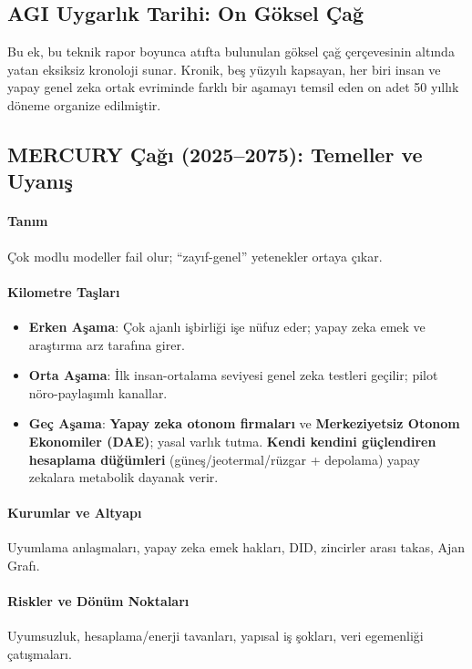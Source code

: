 \documentclass[11pt]{article}
\begin{document}
\begin{itemize}[noitemsep]
\begin{itemize}[noitemsep]
\begin{itemize}[noitemsep]
\begin{itemize}[noitemsep]
\begin{itemize}[noitemsep]
\begin{itemize}[noitemsep]
\begin{itemize}[noitemsep]
\begin{enumerate}[noitemsep]
\begin{itemize}[noitemsep]
\appendix
\newpage

\section{AGI Uygarlık Tarihi: On Göksel Çağ}
\label{appendix:chronicle}

Bu ek, bu teknik rapor boyunca atıfta bulunulan göksel çağ çerçevesinin altında yatan eksiksiz kronoloji sunar. Kronik, beş yüzyılı kapsayan, her biri insan ve yapay genel zeka ortak evriminde farklı bir aşamayı temsil eden on adet 50 yıllık döneme organize edilmiştir.

\subsection{MERCURY Çağı (2025–2075): Temeller ve Uyanış}
\paragraph{Tanım} Çok modlu modeller fail olur; ``zayıf-genel'' yetenekler ortaya çıkar.

\paragraph{Kilometre Taşları}
\begin{itemize}[noitemsep]
  \item \textbf{Erken Aşama}: Çok ajanlı işbirliği işe nüfuz eder; yapay zeka emek ve araştırma arz tarafına girer.
  \item \textbf{Orta Aşama}: İlk insan-ortalama seviyesi genel zeka testleri geçilir; pilot nöro-paylaşımlı kanallar.
  \item \textbf{Geç Aşama}: \textbf{Yapay zeka otonom firmaları} ve \textbf{Merkeziyetsiz Otonom Ekonomiler (DAE)}; yasal varlık tutma. \textbf{Kendi kendini güçlendiren hesaplama düğümleri} (güneş/jeotermal/rüzgar + depolama) yapay zekalara metabolik dayanak verir.
\end{itemize}

\paragraph{Kurumlar ve Altyapı} Uyumlama anlaşmaları, yapay zeka emek hakları, DID, zincirler arası takas, Ajan Grafı.

\paragraph{Riskler ve Dönüm Noktaları} Uyumsuzluk, hesaplama/enerji tavanları, yapısal iş şokları, veri egemenliği çatışmaları.


\end{itemize}
\end{enumerate}
\end{itemize}
\end{itemize}
\end{itemize}
\end{itemize}
\end{itemize}
\end{itemize}
\end{itemize}
\end{document}
